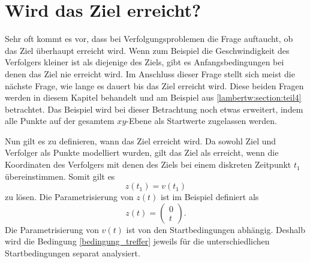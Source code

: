 %
%
%
\section{Wird das Ziel erreicht?
\label{lambertw:section:Wird_das_Ziel_erreicht}}
%
Sehr oft kommt es vor, dass bei Verfolgungsproblemen die Frage auftaucht, ob das Ziel überhaupt erreicht wird.
Wenn zum Beispiel die Geschwindigkeit des Verfolgers kleiner ist als diejenige des Ziels, gibt es Anfangsbedingungen bei denen das Ziel nie erreicht wird.
Im Anschluss dieser Frage stellt sich meist die nächste Frage, wie lange es dauert bis das Ziel erreicht wird.
Diese beiden Fragen werden in diesem Kapitel behandelt und am Beispiel aus \ref{lambertw:section:teil4} betrachtet.
Das Beispiel wird bei dieser Betrachtung noch etwas erweitert, indem alle Punkte auf der gesamtem $xy$-Ebene als Startwerte zugelassen werden.

Nun gilt es zu definieren, wann das Ziel erreicht wird.
Da sowohl Ziel und Verfolger als Punkte modelliert wurden, gilt das Ziel als erreicht, wenn die Koordinaten des Verfolgers mit denen des Ziels bei einem diskreten Zeitpunkt $t_1$ übereinstimmen.
Somit gilt es
%
\begin{equation}
    z(t_1)=v(t_1)
    \label{bedingung_treffer}
\end{equation}
%
zu lösen.
Die Parametrisierung von $z(t)$ ist im Beispiel definiert als
\begin{equation}
    z(t)
    =
    \left( \begin{array}{c} 0 \\ t \end{array} \right)\text{.}
\end{equation}
%
Die Parametrisierung von $v(t)$ ist von den Startbedingungen abhängig. Deshalb wird die Bedingung \eqref{bedingung_treffer} jeweils für die unterschiedlichen Startbedingungen separat analysiert.
%
